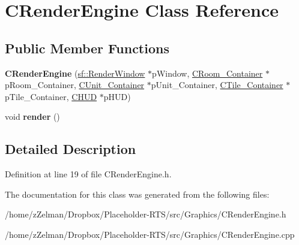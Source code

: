 \hypertarget{classCRenderEngine}{\section{C\-Render\-Engine Class Reference}
\label{classCRenderEngine}
}
\subsection*{Public Member Functions}
\begin{DoxyCompactItemize}
\item 
\hypertarget{classCRenderEngine_af6f482173b9ee00d217d15866dc6376b}{{\bfseries C\-Render\-Engine} (\hyperlink{classsf_1_1RenderWindow}{sf\-::\-Render\-Window} $\ast$p\-Window, \hyperlink{classCRoom__Container}{C\-Room\-\_\-\-Container} $\ast$p\-Room\-\_\-\-Container, \hyperlink{classCUnit__Container}{C\-Unit\-\_\-\-Container} $\ast$p\-Unit\-\_\-\-Container, \hyperlink{classCTile__Container}{C\-Tile\-\_\-\-Container} $\ast$p\-Tile\-\_\-\-Container, \hyperlink{classCHUD}{C\-H\-U\-D} $\ast$p\-H\-U\-D)}\label{classCRenderEngine_af6f482173b9ee00d217d15866dc6376b}

\item 
\hypertarget{classCRenderEngine_a38c058de2a8b54f208decdaa7b799ada}{void {\bfseries render} ()}\label{classCRenderEngine_a38c058de2a8b54f208decdaa7b799ada}

\end{DoxyCompactItemize}


\subsection{Detailed Description}


Definition at line 19 of file C\-Render\-Engine.\-h.



The documentation for this class was generated from the following files\-:\begin{DoxyCompactItemize}
\item 
/home/z\-Zelman/\-Dropbox/\-Placeholder-\/\-R\-T\-S/src/\-Graphics/C\-Render\-Engine.\-h\item 
/home/z\-Zelman/\-Dropbox/\-Placeholder-\/\-R\-T\-S/src/\-Graphics/C\-Render\-Engine.\-cpp\end{DoxyCompactItemize}
